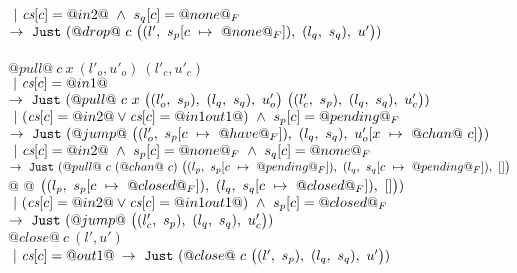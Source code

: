 \begin{figure*}
\begin{tabbing}
\> \> $~|~\cs[c]=@in2@ ~\wedge~ s_q[c]=@none@_F$
\> \hspace{2em} $\to~\Just (@drop@~c~
      \nextStep
        {l'}
          {\HeapUpdateOne{c}{@none@_F}{s_p}}
        {l_q}
          {s_q}
        {u'})
      $
\> 
\\[1ex]

\\



\> $@pull@~c~x~(l'_o,u'_o)~(l'_c,u'_c)$ \\
\> \> $~|~\cs[c]=@in1@$ 
\\
\> \> $\to~\Just (@pull@~c~x~
      \nextStep
        {l'_o}{s_p}
        {l_q}{s_q}
        {u'_o}
      ~
      \nextStep
        {l'_c}{s_p}
        {l_q}{s_q}
        {u'_c})
    $ 
\> \> 
\\[1ex]

\> \> $~|~(\cs[c]=@in2@ \vee \cs[c]=@in1out1@) ~\wedge~ s_p[c]=@pending@_F$ \\
\> \> $\to~\Just (@jump@~
      \nextStep
        {l'_o}
          {\HeapUpdateOne{c}{@have@_F}{s_p}}
        {l_q}
          {s_q}
        {\HeapUpdateOne{x}{@chan@~c}{u'_o}})
        $ 
\> \>  
\\[1ex]

\> \> $~|~\cs[c]=@in2@ ~\wedge~ s_p[c]=@none@_F ~\wedge~ s_q[c]=@none@_F$ \\
\> \> $\to~\Just (@pull@~c~(@chan@~c)~
      \nextStep
        {l_p}
          {\HeapUpdateOne{c}{@pending@_F}{s_p}}
        {l_q}
          {\HeapUpdateOne{c}{@pending@_F}{s_q}}
        {[]}$
      \\
\> \> @                     @
      $\nextStep
        {l_p}
          {\HeapUpdateOne{c}{@closed@_F}{s_p}}
        {l_q}
          {\HeapUpdateOne{c}{@closed@_F}{s_q}}
        {[]})
  $
\> \> 
\\[1ex]

\> \> $~|~(\cs[c]=@in2@ \vee \cs[c]=@in1out1@) ~\wedge~ s_p[c]=@closed@_F$ \\
\> \> $\to~\Just (@jump@~
      \nextStep
        {l'_c}{s_p}
        {l_q}{s_q}
        {u'_c})
  $
\> \> 
\\[1ex]

\> $@close@~c~(l',u')$ \\
\> \> $~|~\cs[c]=@out1@$ 
\> $\to~\Just (@close@~c~
      \nextStep
        {l'}{s_p}
        {l_q}{s_q}
        {u'})
    $ 
\> 
\\


\end{tabbing}
\end{figure*}
